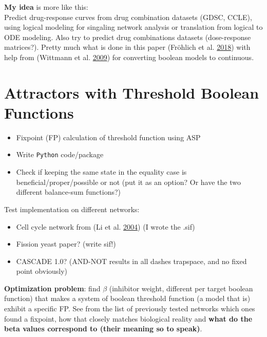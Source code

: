 \documentclass[
  12pt,
]{book}
\providecommand{\tightlist}{%
  \setlength{\itemsep}{0pt}\setlength{\parskip}{0pt}}
\begin{document}
\textbf{My idea} is more like this:\\
Predict drug-response curves from drug combination datasets (GDSC, CCLE),
using logical modeling for singaling network analysis or translation from
logical to ODE modeling. Also try to predict drug combinations datasets
(dose-response matrices?). Pretty much what is done in this paper (Fröhlich et al. \protect\hyperlink{ref-Frohlich2018}{2018})
with help from (Wittmann et al. \protect\hyperlink{ref-Wittmann2009}{2009}) for converting boolean models to continuous.

\hypertarget{attractors-with-threshold-boolean-functions}{%
\section*{Attractors with Threshold Boolean Functions}\label{attractors-with-threshold-boolean-functions}}

\begin{itemize}
\tightlist
\item
  Fixpoint (FP) calculation of threshold function using ASP
\item
  Write \texttt{Python} code/package
\item
  Check if keeping the same state in the equality case is beneficial/proper/possible or not (put it as an option? Or have the two different balance-sum functions?)
\end{itemize}

Test implementation on different networks:

\begin{itemize}
\tightlist
\item
  Cell cycle network from (Li et al. \protect\hyperlink{ref-Li2004}{2004}) (I wrote the .sif)
\item
  Fission yeast paper? (write sif!)
\item
  CASCADE 1.0? (AND-NOT results in all dashes trapspace, and no fixed point obviously)
\end{itemize}

\textbf{Optimization problem}: find \(\beta\) (inhibitor weight, different per target boolean function) that makes a system of boolean threshold function (a model that is) exhibit a specific FP.
See from the list of previously tested networks which ones found a fixpoint, how that closely matches biological reality and \textbf{what do the beta values correspond to (their meaning so to speak)}.
\end{document}
